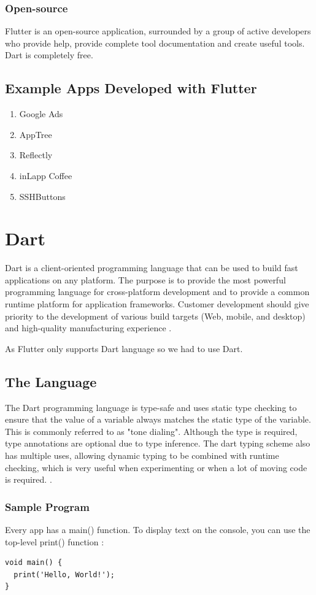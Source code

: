 \subsubsection{Open-source}
Flutter is an open-source application, surrounded by a group of active developers who provide help, provide complete tool documentation and create useful tools. Dart is completely free.

\subsection{Example Apps Developed with Flutter}
\begin{enumerate}
    \item Google Ads
    \item AppTree
    \item Reflectly
    \item inLapp Coffee
    \item SSHButtons
\end{enumerate}

\section{Dart}
Dart is a client-oriented programming language that can be used to build fast applications on any platform. The purpose is to provide the most powerful programming language for cross-platform development and to provide a common runtime platform for application frameworks. Customer development should give priority to the development of various build targets (Web, mobile, and desktop)  and high-quality manufacturing experience \cite{DartDev5:online}.

As Flutter only supports Dart language so we had to use Dart.

\subsection{The Language}
The Dart programming language is type-safe and uses static type checking to ensure that the value of a variable always matches the static type of the variable. This is commonly referred to as "tone dialing". Although the type is required, type annotations are optional due to type inference. The dart typing scheme also has multiple uses, allowing dynamic typing to be combined with runtime checking, which is very useful when experimenting or when a lot of moving code is required. \cite{DartDev5:online}.

\subsubsection{Sample Program}
Every app has a main() function. To display text on the console, you can use the top-level print() function \cite{LanguageSampleDart:online}:
\begin{verbatim}
void main() {
  print('Hello, World!');
}
\end{verbatim}

